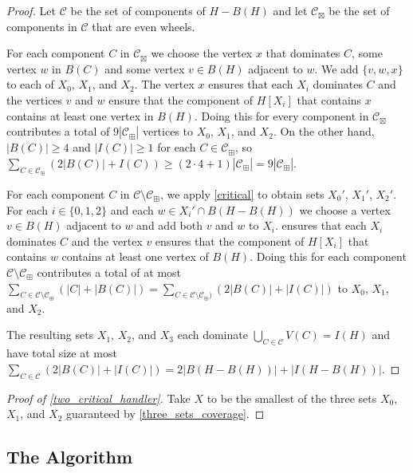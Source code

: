 \documentclass[11pt]{article}
\newcommand{\pat}[1]{\textcolor{red}{PM: #1}}
\newcommand{\hussein}[1]{\textcolor{purple}{HH: #1}}
\theoremstyle{definition}
\begin{document}
\begin{proof}
  Let $\mathcal{C}$ be the set of components of $H-B(H)$
  and let $\mathcal{C}_{\boxtimes}$ be the set of components in $\mathcal{C}$  that are even wheels.

  For each component $C$ in $\mathcal{C}_{\boxtimes}$ we choose the vertex $x$ that dominates $C$, some vertex $w$ in $B(C)$ and some vertex $v\in B(H)$ adjacent to $w$.  We add $\{v,w,x\}$ to each of $X_0$, $X_1$, and $X_2$. The vertex $x$ ensures that each $X_i$ dominates $C$ and the vertices $v$ and $w$ ensure that the component of $H[X_i]$ that contains $x$ contains at least one vertex in $B(H)$.  Doing this for every component in $\mathcal{C}_{\boxtimes}$ contributes a total of $9|\mathcal{C}_{\boxplus}|$ vertices to $X_0$, $X_1$, and $X_2$. On the other hand, $|B(C)|\ge 4$ and $|I(C)|\ge 1$ for each $C\in \mathcal{C}_{\boxplus}$, so $\sum_{C\in \mathcal{C}_{\boxplus}} (2|B(C)| + I(C))\ge (2\cdot 4+1)|\mathcal{C}_{\boxplus}| = 9|\mathcal{C}_{\boxplus}|$.

  For each component $C$ in $\mathcal{C}\setminus\mathcal{C}_{\boxplus}$, we apply \cref{critical} to obtain sets $X_0'$, $X_1'$, $X_2'$. For each $i\in\{0,1,2\}$ and each $w\in X_i'\cap B(H-B(H))$ we choose a vertex $v\in B(H)$ adjacent to $w$ and add both $v$ and $w$ to $X_i$.  ensures that each $X_i$ dominates $C$ and the vertex $v$ ensures that the component of $H[X_i]$ that contains $w$ contains at least one vertex of $B(H)$.
  Doing this for each component $\mathcal{C}\setminus\mathcal{C}_\boxplus$ contributes a total of at most  $\sum_{C\in\mathcal{C}\setminus\mathcal{C}_{\boxplus}}(|C|+|B(C)|)=\sum_{C\in\mathcal{C}\setminus \mathcal{C}_{\boxplus})}(2|B(C)|+|I(C)|)$ to $X_0$, $X_1$, and $X_2$.

  The resulting sets $X_1$, $X_2$, and $X_3$ each dominate $\bigcup_{C\in\mathcal{C}} V(C)=I(H)$ and have total size at most $\sum_{C\in\mathcal{C}} (2|B(C)|+|I(C)|) = 2|B(H-B(H))| + |I(H-B(H))|$.
\end{proof}

\begin{proof}[Proof of \cref{two_critical_handler}]
  Take $X$ to be the smallest of the three sets $X_0$, $X_1$, and $X_2$ guaranteed by \cref{three_sets_coverage}.
\end{proof}


\subsection{The Algorithm}
\end{document}
